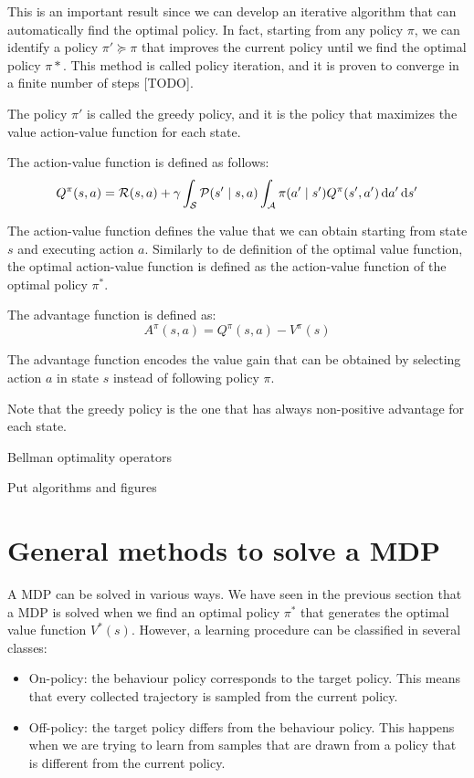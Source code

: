 This is an important result since we can develop an iterative algorithm that can automatically find the optimal policy. In fact, starting from any policy $\pi$, we can identify a policy $\pi' \succcurlyeq \pi$ that improves the current policy until we find the optimal policy $\pi*$. This method is called policy iteration, and it is proven to converge in a finite number of steps [TODO]. 

The policy $\pi'$ is called the greedy policy, and it is the policy that maximizes the value action-value function for each state. 

\begin{definition}
The action-value function is defined as follows:
\[
Q^{\pi}(s, a) = \mathcal{R}(s, a) + \gamma \int_{\mathcal{S}} \mathcal{P} (s' \mid s, a) \int_{\mathcal{A}} \pi(a' \mid s') Q^{\pi} (s', a') \, \textrm{d} a' \, \textrm{d} s'
\]
\end{definition}

The action-value function defines the value that we can obtain starting from state $s$ and executing action $a$. Similarly to de definition of the optimal value function, the optimal action-value function is defined as the action-value function of the optimal policy $\pi^*$. 

\begin{definition}[Advantage]
The advantage function is defined as:
\[
A^{\pi}(s,a) = Q^{\pi}(s,a) - V^{\pi}(s)
\]
\end{definition}

The advantage function encodes the value gain that can be obtained by selecting action $a$ in state $s$ instead of following policy $\pi$. 


Note that the greedy policy is the one that has always non-positive advantage for each state. 


Bellman optimality operators

Put algorithms and figures

\section{General methods to solve a MDP}
A MDP can be solved in various ways. We have seen in the previous section that a MDP is solved when we find an optimal policy $\pi^*$ that generates the optimal value function $V^*(s)$. However, a learning procedure can be classified in several classes:
\begin{itemize}
\item On-policy: the behaviour policy corresponds to the target policy. This means that every collected trajectory is sampled from the current policy.
\item Off-policy: the target policy differs from the behaviour policy. This happens when we are trying to learn from samples that are drawn from a policy that is different from the current policy.
\end{itemize}

